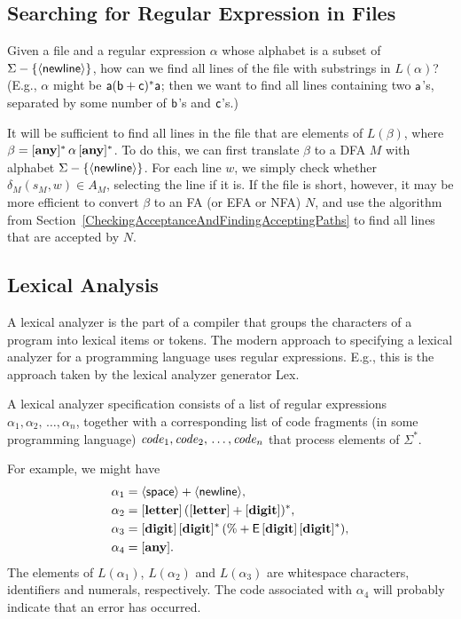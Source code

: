 \subsection{Searching for Regular Expression in Files}

Given a file and a regular expression $\alpha$ whose alphabet is a
subset of $\Sigma-\{\mathsf{\langle newline\rangle}\}$, how can we find all lines of the
file with substrings in $L(\alpha)$?  (E.g., $\alpha$ might be
$\mathsf{\mathsf{a}(\mathsf{b}+\mathsf{c})^*\mathsf{a}}$; then we want to find all lines
containing two $\mathsf{a}$'s, separated by some number of $\mathsf{b}$'s and
$\mathsf{c}$'s.)

It will be sufficient to find all lines in the file that are elements
of $L(\beta)$, where $\beta = [\mathbf{any}]^*\,\alpha\,[\mathbf{any}]^*$.  To do this, we
can first translate $\beta$ to a DFA $M$ with alphabet
$\Sigma-\{\mathsf{\langle newline\rangle}\}$.  For each line $w$, we simply check whether
$\delta_M(s_M,w)\in A_M$, selecting the line if it is.  If the file is
short, however, it may be more efficient to convert $\beta$ to an FA
(or EFA or NFA) $N$, and use the algorithm from
Section~\ref{CheckingAcceptanceAndFindingAcceptingPaths} to find all
lines that are accepted by $N$.

\subsection{Lexical Analysis}

A lexical analyzer is the part of a compiler that groups the
characters of a program into lexical items or tokens.  The modern
approach to specifying a lexical analyzer for a programming language
uses regular expressions.  E.g., this is the approach taken by the
lexical analyzer generator Lex.

A lexical analyzer specification consists of a list of regular
expressions $\alpha_1,\alpha_2,\,\ldots,\alpha_n$, together with a
corresponding list of code fragments (in some programming language)
${\it code}_1,{\it code}_2,\,\ldots,{\it code}_n$ that process elements of
$\Sigma^*$.

For example, we might have
\begin{align*}
\alpha_1 &= \mathsf{\langle space\rangle} + \mathsf{\langle newline\rangle} , \\
\alpha_2 &= [\mathbf{letter}]\,([\mathbf{letter}] + [\mathbf{digit}])^* ,\\
\alpha_3 &= [\mathbf{digit}]\,[\mathbf{digit}]^*\,(\% + \mathsf{E}\,[\mathbf{digit}]\,[\mathbf{digit}]^*) , \\
\alpha_4 &= [\mathbf{any}] .
\end{align*}
The elements of $L(\alpha_1)$, $L(\alpha_2)$ and $L(\alpha_3)$ are
whitespace characters, identifiers and numerals, respectively.  The
code associated with $\alpha_4$ will probably indicate that an error
has occurred.

